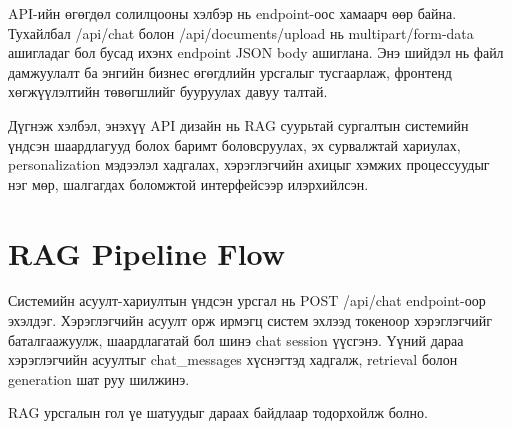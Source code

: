 \documentclass[12pt,A4]{report}
\newcommand{\eng}[1]{#1}
\begin{document}
API-ийн өгөгдөл солилцооны хэлбэр нь endpoint-оос хамаарч өөр байна. Тухайлбал \eng{/api/chat} болон \eng{/api/documents/upload} нь \eng{multipart/form-data} ашигладаг бол бусад ихэнх endpoint \eng{JSON body} ашиглана. Энэ шийдэл нь файл дамжуулалт ба энгийн бизнес өгөгдлийн урсгалыг тусгаарлаж, фронтенд хөгжүүлэлтийн төвөгшлийг бууруулах давуу талтай.

Дүгнэж хэлбэл, энэхүү API дизайн нь RAG суурьтай сургалтын системийн үндсэн шаардлагууд болох баримт боловсруулах, эх сурвалжтай хариулах, personalization мэдээлэл хадгалах, хэрэглэгчийн ахицыг хэмжих процессуудыг нэг мөр, шалгагдах боломжтой интерфейсээр илэрхийлсэн.

\section{RAG Pipeline Flow}

Системийн асуулт-хариултын үндсэн урсгал нь \eng{POST /api/chat} endpoint-оор эхэлдэг. Хэрэглэгчийн асуулт орж ирмэгц систем эхлээд токеноор хэрэглэгчийг баталгаажуулж, шаардлагатай бол шинэ \eng{chat session} үүсгэнэ. Үүний дараа хэрэглэгчийн асуултыг \eng{chat\_messages} хүснэгтэд хадгалж, retrieval болон generation шат руу шилжинэ.

RAG урсгалын гол үе шатуудыг дараах байдлаар тодорхойлж болно.
\end{document}
